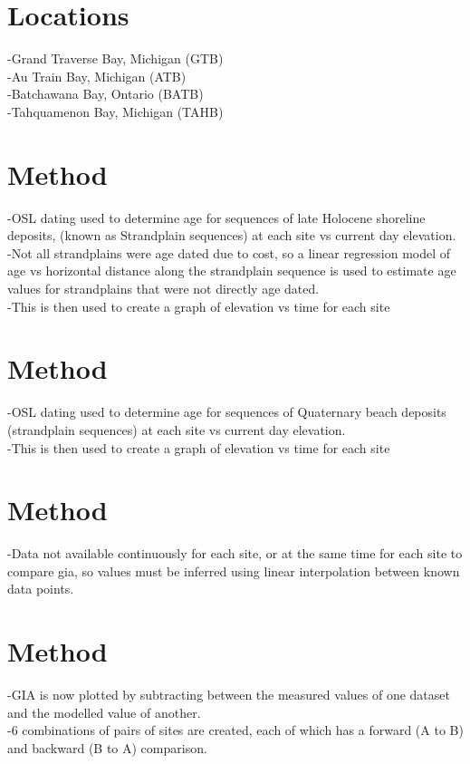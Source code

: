 \documentclass{article}
\begin{document}

\section{Locations}   
-Grand Traverse Bay, Michigan (GTB)\\
-Au Train Bay, Michigan (ATB)\\
-Batchawana Bay, Ontario (BATB)\\
-Tahquamenon Bay, Michigan (TAHB)\\
\newpage
\section{Method}
-OSL dating used to determine age for sequences of late Holocene shoreline
deposits, (known as Strandplain sequences) at each site vs current day elevation.\\
-Not all strandplains were age dated due to cost, so a linear regression model of age vs horizontal distance along the strandplain sequence is used to estimate age values for strandplains that were not directly age dated.\\
-This is then used to create a graph of elevation vs time for each site\\
\newpage
\section[2]{Method}
-OSL dating used to determine age for sequences of Quaternary beach deposits (strandplain sequences) at each site vs current day elevation.\\
-This is then used to create a graph of elevation vs time for each site\\

\newpage
\section[2]{Method}
-Data not available continuously for each site, or at the same time for each site to compare gia, so values must be inferred using linear interpolation between known data points.\\

\newpage
\section[2]{Method}
-GIA is now plotted by subtracting between the measured values of one dataset and the modelled value of another.\\
-6 combinations of pairs of sites are created, each of which has a forward (A to B) and backward (B to A) comparison.\\

\end{document}
